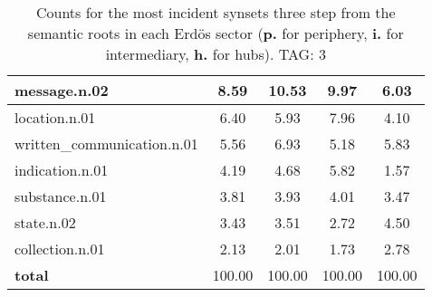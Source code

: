 \begin{table}[h!]
\begin{center}
\begin{tabular}{| l || c | c | c | c |}
message.n.02 & 8.59  & 10.53  & 9.97  & 6.03 \\\hline
location.n.01 & 6.40  & 5.93  & 7.96  & 4.10 \\\hline
written\_communication.n.01 & 5.56  & 6.93  & 5.18  & 5.83 \\\hline
indication.n.01 & 4.19  & 4.68  & 5.82  & 1.57 \\\hline
substance.n.01 & 3.81  & 3.93  & 4.01  & 3.47 \\\hline
state.n.02 & 3.43  & 3.51  & 2.72  & 4.50 \\\hline
collection.n.01 & 2.13  & 2.01  & 1.73  & 2.78 \\\hline\hline
{{\bf total}} & 100.00  & 100.00  & 100.00  & 100.00 \\\hline
\end{tabular}
\caption{Counts for the most incident synsets three step from the semantic roots in each Erd\"os sector ({\bf p.} for periphery, {\bf i.} for intermediary, {\bf h.} for hubs). TAG: 3}
\end{center}
\end{table}